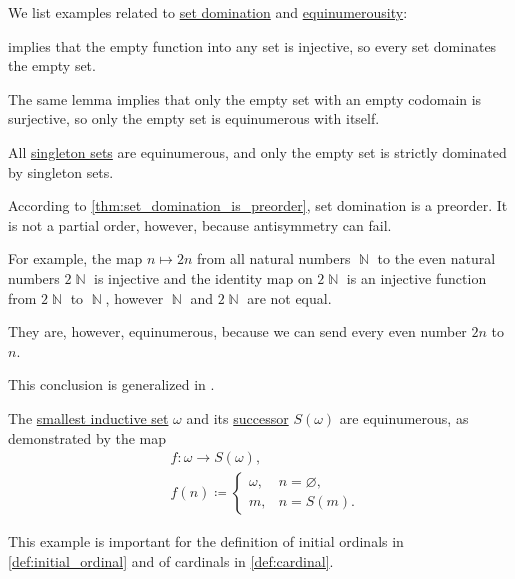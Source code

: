 \begin{example}\label{ex:set_domination_and_equinumerosity}
  We list examples related to \hyperref[def:set_domination]{set domination} and \hyperref[def:equinumerosity]{equinumerousity}:
  \begin{thmenum}
      implies that the empty function into any set is injective, so every set dominates the empty set.

    The same lemma implies that only the empty set with an empty codomain is surjective, so only the empty set is equinumerous with itself.

     All \hyperref[def:singleton_set]{singleton sets} are equinumerous, and only the empty set is strictly dominated by singleton sets.

     According to \cref{thm:set_domination_is_preorder}, set domination is a preorder. It is not a partial order, however, because antisymmetry can fail.

    For example, the map \( n \mapsto 2n \) from all natural numbers \( \BbbN \) to the even natural numbers \( 2\BbbN \) is injective and the identity map on \( 2\BbbN \) is an injective function from \( 2\BbbN \) to \( \BbbN \), however \( \BbbN \) and \( 2\BbbN \) are not equal.

    They are, however, equinumerous, because we can send every even number \( 2n \) to \( n \).

    This conclusion is generalized in .

     The \hyperref[def:smallest_inductive_set]{smallest inductive set} \( \omega \) and its \hyperref[def:ordinal_successor]{successor} \( S(\omega) \) are equinumerous, as demonstrated by the map
    \begin{equation*}
      \begin{aligned}
        &f: \omega \to S(\omega), \\
        &f(n) \coloneqq \begin{cases}
          \omega, &n = \varnothing, \\
          m,      &n = S(m).
        \end{cases}
      \end{aligned}
    \end{equation*}

    This example is important for the definition of initial ordinals in \cref{def:initial_ordinal} and of cardinals in \cref{def:cardinal}.
  \end{thmenum}
\end{example}

